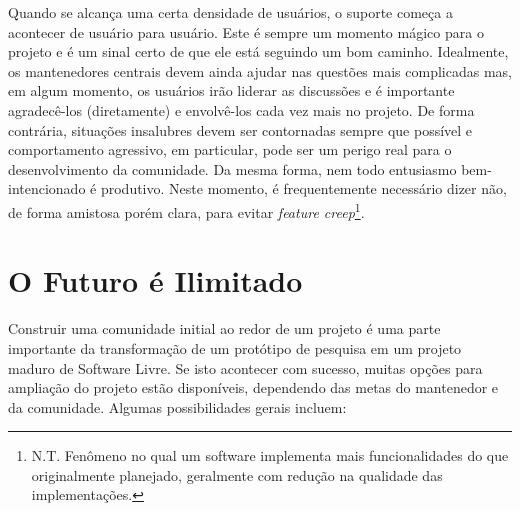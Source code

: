 Quando se alcança uma certa densidade de usuários, o suporte começa a acontecer de
usuário para usuário. Este é sempre um momento mágico para o projeto e é um sinal
certo de que ele está seguindo um bom caminho. Idealmente, os mantenedores centrais
devem ainda ajudar nas questões mais complicadas mas, em algum momento, os usuários
irão liderar as discussões e é importante agradecê-los (diretamente) e envolvê-los
cada vez mais no projeto. De forma contrária, situações insalubres devem ser contornadas
sempre que possível e comportamento agressivo, em particular, pode ser um perigo real
para o desenvolvimento da comunidade. Da mesma forma, nem todo entusiasmo bem-intencionado
é produtivo. Neste momento, é frequentemente necessário dizer não, de forma amistosa porém
clara, para evitar \textit{feature creep}\footnote{N.T. Fenômeno no qual um software
implementa mais funcionalidades do que originalmente planejado, geralmente com redução
na qualidade das implementações.}.

\section*{O Futuro é Ilimitado}

Construir uma comunidade initial ao redor de um projeto é uma parte importante
da transformação de um protótipo de pesquisa em um projeto maduro de Software Livre.
Se isto acontecer com sucesso, muitas opções para ampliação do projeto estão disponíveis,
dependendo das metas do mantenedor e da comunidade. Algumas possibilidades gerais incluem:

